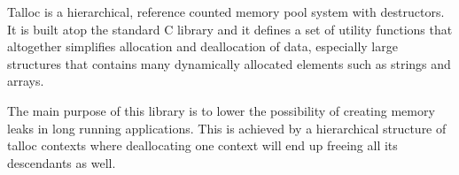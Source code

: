Talloc is a hierarchical, reference counted memory pool system with destructors.
It is built atop the standard C library and it defines a set of utility
functions that altogether simplifies allocation and deallocation of data,
especially large structures that contains many dynamically allocated elements
such as strings and arrays.

The main purpose of this library is to lower the possibility of creating
memory leaks in long running applications. This is achieved by a hierarchical
structure of talloc contexts where deallocating one context will end up
freeing all its descendants as well.

